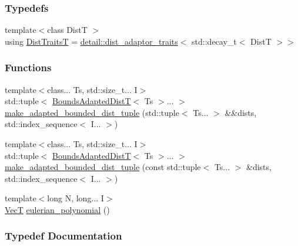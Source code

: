 \subsubsection*{Typedefs}
\begin{DoxyCompactItemize}
\item 
{\footnotesize template$<$class DistT $>$ }\\using \hyperlink{namespaceprior__hessian_1_1detail_a00684f44608e5a5bf76458d81159f924}{Dist\+TraitsT} = \hyperlink{classprior__hessian_1_1detail_1_1dist__adaptor__traits}{detail\+::dist\+\_\+adaptor\+\_\+traits}$<$ std\+::decay\+\_\+t$<$ DistT $>$$>$
\end{DoxyCompactItemize}
\subsubsection*{Functions}
\begin{DoxyCompactItemize}
\item 
{\footnotesize template$<$class... Ts, std\+::size\+\_\+t... I$>$ }\\std\+::tuple$<$ \hyperlink{namespaceprior__hessian_a919f0d7f51ea845224ca7f03983508a9}{Bounds\+Adapted\+DistT}$<$ Ts $>$... $>$ \hyperlink{namespaceprior__hessian_1_1detail_a13ee7e8b01109559d15a98dcdc1949d3}{make\+\_\+adapted\+\_\+bounded\+\_\+dist\+\_\+tuple} (std\+::tuple$<$ Ts... $>$ \&\&dists, std\+::index\+\_\+sequence$<$ I... $>$)
\item 
{\footnotesize template$<$class... Ts, std\+::size\+\_\+t... I$>$ }\\std\+::tuple$<$ \hyperlink{namespaceprior__hessian_a919f0d7f51ea845224ca7f03983508a9}{Bounds\+Adapted\+DistT}$<$ Ts $>$... $>$ \hyperlink{namespaceprior__hessian_1_1detail_a112a6e8be541a29b2c8b366f26e6d72e}{make\+\_\+adapted\+\_\+bounded\+\_\+dist\+\_\+tuple} (const std\+::tuple$<$ Ts... $>$ \&dists, std\+::index\+\_\+sequence$<$ I... $>$)
\item 
{\footnotesize template$<$long N, long... I$>$ }\\\hyperlink{namespaceprior__hessian_a0b42fc70dec525d83fb2ac155d9ab974}{VecT} \hyperlink{namespaceprior__hessian_1_1detail_a94c4015a4b09f513fc7de59a15c9247c}{eulerian\+\_\+polynomial} ()
\end{DoxyCompactItemize}


\subsubsection{Typedef Documentation}
